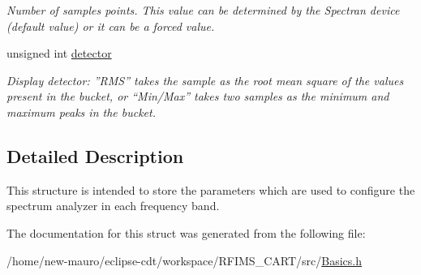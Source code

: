 \begin{DoxyCompactItemize}
\begin{DoxyCompactList}\small\item\em Number of samples points. This value can be determined by the Spectran device (default value) or it can be a forced value. \end{DoxyCompactList}\item 
\mbox{\label{structBandParameters_a37ddad49ed6a8562c878d60081c65188}} 
unsigned int \hyperlink{structBandParameters_a37ddad49ed6a8562c878d60081c65188}{detector}
\begin{DoxyCompactList}\small\item\em Display detector\+: ”\+R\+M\+S” takes the sample as the root mean square of the values present in the bucket, or “\+Min/\+Max” takes two samples as the minimum and maximum peaks in the bucket. \end{DoxyCompactList}\end{DoxyCompactItemize}


\subsection{Detailed Description}
This structure is intended to store the parameters which are used to configure the spectrum analyzer in each frequency band. 

The documentation for this struct was generated from the following file\+:\begin{DoxyCompactItemize}
\item 
/home/new-\/mauro/eclipse-\/cdt/workspace/\+R\+F\+I\+M\+S\+\_\+\+C\+A\+R\+T/src/\hyperlink{Basics_8h}{Basics.\+h}\end{DoxyCompactItemize}
